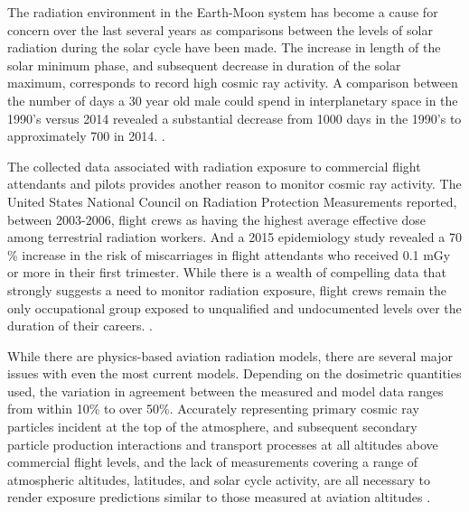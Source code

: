 


The radiation environment in the Earth-Moon system has become a cause for concern over the last several years as comparisons between the levels of solar radiation during the solar cycle have been made. The increase in length of the solar minimum phase, and subsequent decrease in duration of the solar maximum, corresponds to record high cosmic ray activity.  A comparison between the number of days a 30 year old male could spend in interplanetary space in the 1990's versus 2014 revealed a substantial decrease from 1000 days in the 1990's to approximately 700 in 2014. \cite{cosmic_flux}.

The collected data associated with radiation exposure to commercial flight attendants and pilots provides another reason to monitor cosmic ray activity.  The United States National Council on Radiation Protection Measurements reported, between 2003-2006, flight crews as having the highest average effective dose among terrestrial radiation workers.  And a 2015 epidemiology study revealed a 70 \% increase in the risk of miscarriages in flight attendants who received 0.1 mGy or more in their first trimester.  While there is a wealth of compelling data that strongly suggests a need to monitor radiation exposure, flight crews remain the only occupational group exposed to unqualified and undocumented levels over the duration of their careers. \cite{human_impact}.

While there are physics-based aviation radiation models, there are several major issues with even the most current models. Depending on the dosimetric quantities used, the variation in agreement between the measured and model data ranges from within 10\% to over 50\%. 
Accurately representing primary cosmic ray particles incident at the top of the atmosphere, and subsequent secondary particle production interactions and transport processes at all altitudes above commercial flight levels, and the lack of measurements covering a range of atmospheric altitudes, latitudes, and solar cycle activity, are all necessary to render exposure predictions similar to those measured at aviation altitudes \cite{modeling}. 

